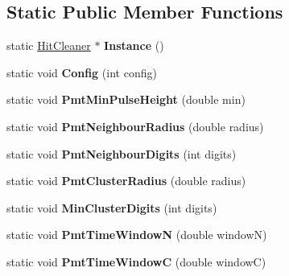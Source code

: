 \subsection*{Static Public Member Functions}
\begin{DoxyCompactItemize}
\item 
\hypertarget{classHitCleaner_a4ac1bde4eec18c427ed249409a6d5d3a}{
static \hyperlink{classHitCleaner}{HitCleaner} $\ast$ {\bfseries Instance} ()}
\label{classHitCleaner_a4ac1bde4eec18c427ed249409a6d5d3a}

\item 
\hypertarget{classHitCleaner_afdf345b322cbef82deb9f35eaddb02d1}{
static void {\bfseries Config} (int config)}
\label{classHitCleaner_afdf345b322cbef82deb9f35eaddb02d1}

\item 
\hypertarget{classHitCleaner_a94987b09a59d9781277f76eee63994a1}{
static void {\bfseries PmtMinPulseHeight} (double min)}
\label{classHitCleaner_a94987b09a59d9781277f76eee63994a1}

\item 
\hypertarget{classHitCleaner_af6d017ac189b0eb6abf064756e78f5ac}{
static void {\bfseries PmtNeighbourRadius} (double radius)}
\label{classHitCleaner_af6d017ac189b0eb6abf064756e78f5ac}

\item 
\hypertarget{classHitCleaner_a43b5a1ac75e62334a8e9ff539a9b34df}{
static void {\bfseries PmtNeighbourDigits} (int digits)}
\label{classHitCleaner_a43b5a1ac75e62334a8e9ff539a9b34df}

\item 
\hypertarget{classHitCleaner_a71881188d23e57c9afb0c8179ff9c5e3}{
static void {\bfseries PmtClusterRadius} (double radius)}
\label{classHitCleaner_a71881188d23e57c9afb0c8179ff9c5e3}

\item 
\hypertarget{classHitCleaner_a8074ae3702ee872e8c8b4504f3bf3987}{
static void {\bfseries MinClusterDigits} (int digits)}
\label{classHitCleaner_a8074ae3702ee872e8c8b4504f3bf3987}

\item 
\hypertarget{classHitCleaner_a2efa2634319c4ff56e51ba28415146a9}{
static void {\bfseries PmtTimeWindowN} (double windowN)}
\label{classHitCleaner_a2efa2634319c4ff56e51ba28415146a9}

\item 
\hypertarget{classHitCleaner_a1962dfdb70798529f8f560c1b6f233fc}{
static void {\bfseries PmtTimeWindowC} (double windowC)}
\label{classHitCleaner_a1962dfdb70798529f8f560c1b6f233fc}

\end{DoxyCompactItemize}


